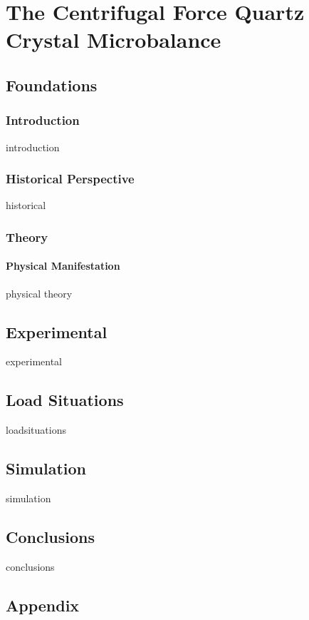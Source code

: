 \documentclass[12pt,a4paper,titlepage,onecolumn]{report}
\begin{document}
\part{The Centrifugal Force Quartz Crystal Microbalance}\label{part:qcm}
\chapter{Foundations}\label{ch:qcmfoundations}
\section{Introduction}
{introduction}
\section{Historical Perspective}
{historical}
\section{Theory}
\subsection{Physical Manifestation}
{physical}
{theory}
\chapter{Experimental}\label{ch:qcmexperimental}
{experimental}
\chapter{Load Situations}\label{ch:qcmloadsituations}
{loadsituations}
\chapter{Simulation}\label{ch:qcmsimulation}
{simulation}
\chapter{Conclusions}\label{ch:qcmconclusions}
{conclusions}

\appendix
\chapter{Appendix}
\end{document}

